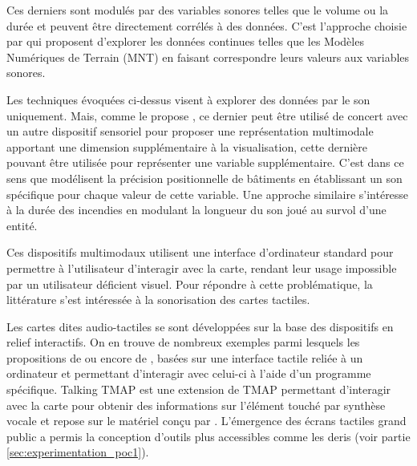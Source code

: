
\newpar{}

Ces derniers sont  modulés par des variables sonores telles que le volume ou la durée et peuvent être directement corrélés à des données. C'est l'approche choisie par \citet{Schito2018} qui proposent d'explorer les données continues telles que les Modèles Numériques de Terrain (MNT) en faisant correspondre leurs valeurs aux variables sonores.

\newpar{}


Les techniques évoquées ci-dessus visent à explorer des données par le son uniquement. Mais, comme le propose \citet{Krygier1994}, ce dernier peut être utilisé de concert avec un autre dispositif sensoriel pour proposer une représentation multimodale apportant une dimension supplémentaire à la visualisation, cette dernière pouvant être utilisée pour représenter une variable supplémentaire. C'est dans ce sens que \citet{Bearman2010} modélisent la précision positionnelle de bâtiments en établissant un son spécifique pour chaque valeur de cette variable. Une approche similaire \citep{Foteinou2022} s'intéresse à la durée des incendies en modulant la longueur du son joué au survol d'une entité.

\newpar{}

Ces dispositifs multimodaux utilisent une interface d'ordinateur standard pour permettre à l'utilisateur d'interagir avec la carte, rendant leur usage impossible par un utilisateur déficient visuel. Pour répondre à cette problématique, la littérature s'est intéressée à la sonorisation des cartes tactiles.

\newpar{}


Les cartes dites audio-tactiles se sont développées sur la base des dispositifs en relief interactifs. On en trouve de nombreux exemples parmi lesquels les propositions de \citet{Loetzsch1994} ou encore de \citet{Landau2001}, basées sur une interface tactile reliée à un ordinateur et permettant d'interagir avec celui-ci à l'aide d'un programme spécifique.
Talking TMAP \citep{Miele2006} est une extension de TMAP \citep{Miele2004} permettant d'interagir avec la carte pour obtenir des informations sur l'élément touché par synthèse vocale et repose sur le matériel conçu par \citet{Landau2001}. L'émergence des écrans tactiles grand public a permis la conception d'outils plus accessibles comme les \glspl{deri} \citep{Brock2015} (voir partie \ref{sec:experimentation_poc1}).

